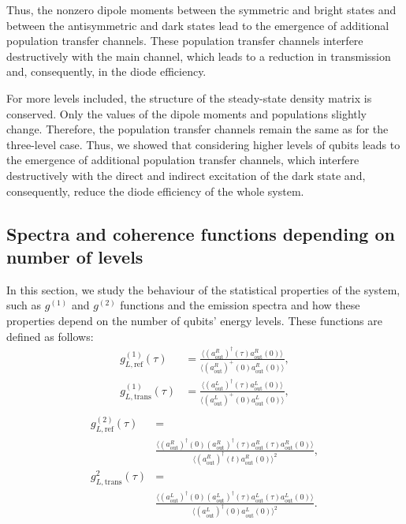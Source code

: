 \documentclass[lettersize,journal]{IEEEtran}
\begin{document}
Thus, the nonzero dipole moments between the symmetric and bright states and between the antisymmetric and dark states lead to the emergence of additional population transfer channels.
These population transfer channels interfere destructively with the main channel, which leads to a reduction in transmission and, consequently, in the diode efficiency.

For more levels included, the structure of the steady-state density matrix is conserved.
Only the values of the dipole moments and populations slightly change.
Therefore, the population transfer channels remain the same as for the three-level case.
Thus, we showed that considering higher levels of qubits leads to the emergence of additional population transfer channels, which interfere destructively with the direct and indirect excitation of the dark state and, consequently, reduce the diode efficiency of the whole system.

\subsection{Spectra and coherence functions depending on number of levels}

In this section, we study the behaviour of the statistical properties of the system, such as $g^{(1)}$ and $g^{(2)}$ functions and the emission spectra and how these properties depend on the number of qubits' energy levels.
These functions are defined as follows:
\begin{equation}\label{eq:20}
    \begin{aligned}
        g^{(1)}_{L,\mathrm{ref}}\left(\tau \right)  &= \frac{\langle (a^{R}_\mathrm{out})^\dag (\tau) a^{R}_\mathrm{out}(0) \rangle}{\langle (a^{R}_\mathrm{out})^+(0) a^{R}_\mathrm{out}(0) \rangle}, \\
        g^{(1)}_{L,\mathrm{trans}}\left(\tau \right)  &= \frac{\langle (a^{L}_\mathrm{out})^\dag (\tau) a^{L}_\mathrm{out}(0) \rangle}{\langle (a^{L}_\mathrm{out})^+(0) a^{L}_\mathrm{out}(0) \rangle}, \\
    \end{aligned}
\end{equation}
\begin{equation}\label{eq:21}
    \begin{aligned}
        g^{(2)}_{L,\mathrm{ref}}\left(\tau \right)  &= \\
        &\frac{\langle (a^{R}_\mathrm{out})^\dag (0) (a^{R}_\mathrm{out})^\dag (\tau) a^{R}_\mathrm{out}(\tau) a^{R}_\mathrm{out}(0)\rangle}{\langle (a^{R}_\mathrm{out})^\dag (t) a^{R}_\mathrm{out}(0) \rangle^2}, \\
        g^{2}_{L,\mathrm{trans}}\left(\tau \right)  &= \\
        &\frac{\langle (a^{L}_\mathrm{out})^\dag (0) (a^{L}_\mathrm{out})^\dag (\tau) a^{L}_\mathrm{out}(\tau) a^{L}_\mathrm{out}(0)\rangle}{\langle (a^{L}_\mathrm{out})^\dag (0) a^{L}_\mathrm{out}(0) \rangle^2}.
    \end{aligned}
\end{equation}
\end{document}
